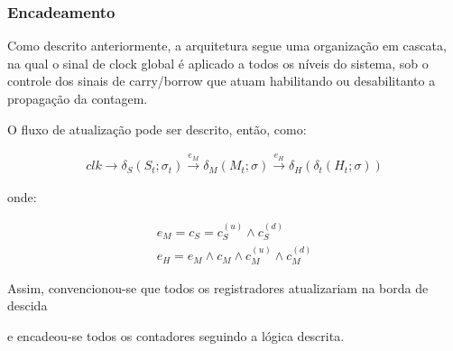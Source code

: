 \subsubsection{Encadeamento}

Como descrito anteriormente, a arquitetura segue uma organização em cascata, na qual o sinal de clock global é aplicado a todos os níveis do sistema, sob o controle dos sinais de carry/borrow que atuam habilitando ou desabilitanto a propagação da contagem.

O fluxo de atualização pode ser descrito, então, como:

\begin{align*}
clk \rightarrow \delta_S(S_t;\sigma_t) \xrightarrow{e_M}  \delta_M(M_t;\sigma) \xrightarrow{e_H} \delta_H(\delta_t(H_t;\sigma))
\end{align*}

onde:

\begin{align*}
e_M = c_S = c_S^{(u)} \land c_S^{(d)} \\
e_H = e_M \land c_M \land c_M^{(u)} \land c_M^{(d)}
\end{align*}

Assim, convencionou-se que todos os registradores atualizariam na borda de descida


e encadeou-se todos os contadores seguindo a lógica descrita.

